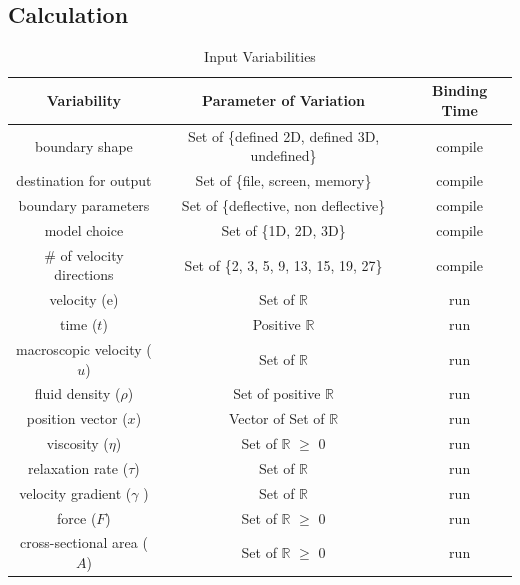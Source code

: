 \documentclass[12pt]{article}
\begin{document}
~\newpage

\subsection{Calculation} \label{sec_Calculation}

\begin{table}[!h]
\begin{center}
\begin{tabular}{| c | c | c |}
\hline
\textbf{Variability} & \textbf{Parameter of Variation} & \textbf{Binding Time}\\
\hline
boundary shape & Set of \{defined 2D, defined 3D, undefined\} & compile \\
\hline
destination for output & Set of \{file, screen, memory\} & compile \\
\hline
boundary parameters & Set of \{deflective, non deflective\} & compile \\
\hline
model choice & Set of \{1D, 2D, 3D\} & compile \\
\hline
\# of velocity directions & Set of \{2, 3, 5, 9,  13, 15, 19, 27\} & compile \\
\hline
velocity ($\mathrm{e}$) & Set of $\mathbb{R}$ & run \\
\hline
time ($t$) & Positive $\mathbb{R}$ & run \\
\hline
macroscopic velocity ($u$) & Set of $\mathbb{R}$ & run \\
\hline
fluid density ($\rho$) & Set of positive $\mathbb{R}$ & run \\
\hline
position vector ($x$) & Vector of Set of $\mathbb{R}$ & run \\
\hline
viscosity ($\eta$) & Set of $\mathbb{R}$ $\geq$ 0 & run \\
\hline
relaxation rate ($\tau$) & Set of $\mathbb{R}$ & run \\
\hline
velocity gradient ($\gamma$ )& Set of $\mathbb{R}$ & run\\
\hline
force ($F$) & Set of $\mathbb{R}$ $\geq$ 0 & run \\
\hline
cross-sectional area ($A$) & Set of $\mathbb{R}$ $\geq$ 0 & run \\
\hline
\end{tabular}
\caption{Input Variabilities}
\label{table:inputVar}
\end{center}
\end{table}
\end{document}
